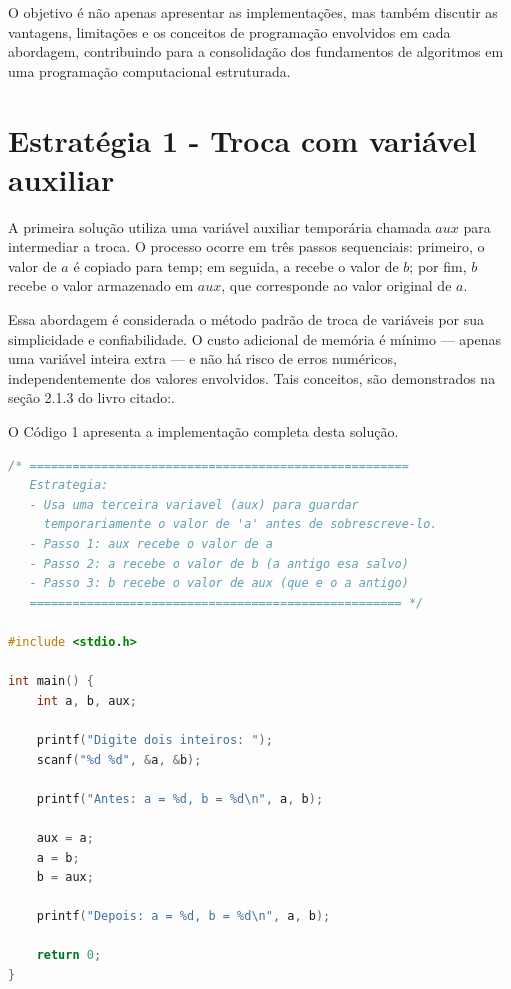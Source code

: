 \documentclass[12pt, a4paper]{article}
\begin{document}
O objetivo é não apenas apresentar as implementações, mas também discutir as 
vantagens, limitações e os conceitos de programação envolvidos em cada abordagem, 
contribuindo para a consolidação dos fundamentos de algoritmos em uma programação 
computacional estruturada.
\pagebreak

\section*{Estratégia 1 - Troca com variável auxiliar}


A primeira solução utiliza uma variável auxiliar temporária chamada $aux$ para 
intermediar a troca. O processo ocorre em três passos sequenciais: primeiro, o 
valor de $a$ é copiado para temp; em seguida, a recebe o valor de $b$; por fim, 
$b$ recebe o valor armazenado em $aux$, que corresponde ao valor original de $a$.


Essa abordagem é considerada o método padrão de troca de variáveis por sua 
simplicidade e confiabilidade. O custo adicional de memória é mínimo — apenas 
uma variável inteira extra — e não há risco de erros numéricos, independentemente 
dos valores envolvidos. Tais conceitos, são demonstrados na seção 2.1.3 do livro 
citado:\cite{medina2006}.


O Código 1 apresenta a implementação completa desta solução.


\begin{lstlisting}[language=C, caption={Troca com variável auxiliar}, label={lst:q1}]
/* =====================================================
   Estrategia:
   - Usa uma terceira variavel (aux) para guardar
     temporariamente o valor de 'a' antes de sobrescreve-lo.
   - Passo 1: aux recebe o valor de a
   - Passo 2: a recebe o valor de b (a antigo esa salvo)
   - Passo 3: b recebe o valor de aux (que e o a antigo)
   ==================================================== */

#include <stdio.h>

int main() {
    int a, b, aux;

    printf("Digite dois inteiros: ");
    scanf("%d %d", &a, &b);

    printf("Antes: a = %d, b = %d\n", a, b);

    aux = a;
    a = b;
    b = aux;

    printf("Depois: a = %d, b = %d\n", a, b);

    return 0;
}
\end{lstlisting}
\end{document}
